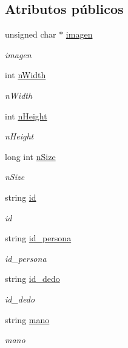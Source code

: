 \subsection*{Atributos públicos}
\begin{DoxyCompactItemize}
\item 
unsigned char $\ast$ \hyperlink{classImagen_a8485fa6dd60a7f067e2d2066599314b0}{imagen}
\begin{DoxyCompactList}\small\item\em imagen \end{DoxyCompactList}\item 
int \hyperlink{classImagen_a7b9235e12e5cc50f29614e9c08d72c4f}{n\+Width}
\begin{DoxyCompactList}\small\item\em n\+Width \end{DoxyCompactList}\item 
int \hyperlink{classImagen_a92935096f7cbcc6ffe32dde43038288c}{n\+Height}
\begin{DoxyCompactList}\small\item\em n\+Height \end{DoxyCompactList}\item 
long int \hyperlink{classImagen_adb26157b4817c521f092f024d28b9435}{n\+Size}
\begin{DoxyCompactList}\small\item\em n\+Size \end{DoxyCompactList}\item 
string \hyperlink{classImagen_a92940ae8127167d1a7041a365555a931}{id}
\begin{DoxyCompactList}\small\item\em id \end{DoxyCompactList}\item 
string \hyperlink{classImagen_aef38d4f4f82b0f19b4b13b20d66e38ba}{id\+\_\+persona}
\begin{DoxyCompactList}\small\item\em id\+\_\+persona \end{DoxyCompactList}\item 
string \hyperlink{classImagen_abdf777e9a6d41cb3b6ee54e9702d0e52}{id\+\_\+dedo}
\begin{DoxyCompactList}\small\item\em id\+\_\+dedo \end{DoxyCompactList}\item 
string \hyperlink{classImagen_a6ac88dc4f15daed005f1055235020821}{mano}
\begin{DoxyCompactList}\small\item\em mano \end{DoxyCompactList}\end{DoxyCompactItemize}



